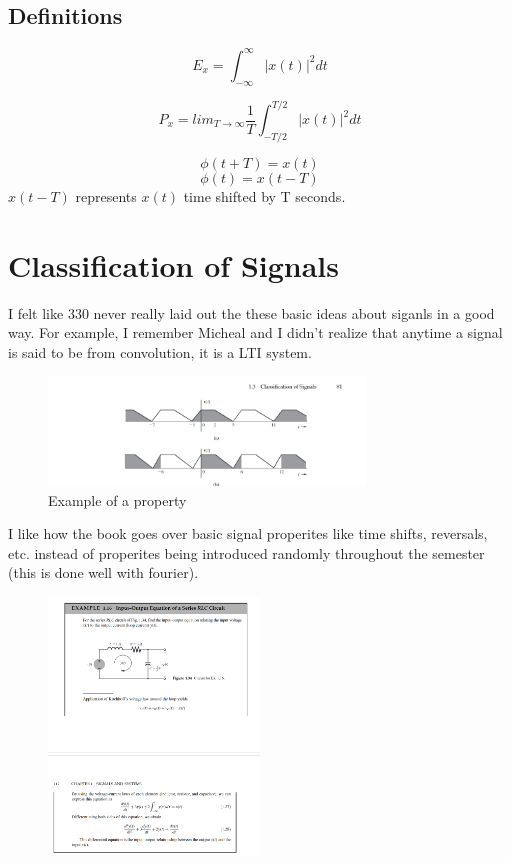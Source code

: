\subsection{Definitions}
\begin{definition}
\[E_x = \int_{-\infty}^{\infty} |x(t)|^2dt \]
\end{definition}

\begin{definition} 
    \[P_x = lim_{T \to \infty} \frac{1}{T} \int_{-T/2}^{T/2} |x(t)|^2dt\]
\end{definition}

\begin{definition} 
    \[\phi(t + T) = x(t)\]
    \[\phi(t) = x(t - T)\]
    $x(t-T)$ represents $x(t)$ time shifted by T seconds.  
\end{definition}

\section{Classification of Signals}
I felt like 330 never really laid out the these basic ideas about siganls in a good way. For example, I remember Micheal and I didn't realize that anytime a signal is said to be from convolution, it is a LTI system.
\begin{figure}[h]
    \centering
    \includegraphics[width = 0.75\textwidth]{images/properties_example_1.3.png}
    \caption{Example of a property}
    \label{fig:properties_example}
\end{figure}

I like how the book goes over basic signal properites like time shifts, reversals, etc. instead of properites being introduced randomly throughout the semester (this is done well with fourier).

\begin{figure}
    \center \includegraphics[width = 0.5\textwidth]{images/circuit_input_output_example.png}
\end{figure}

